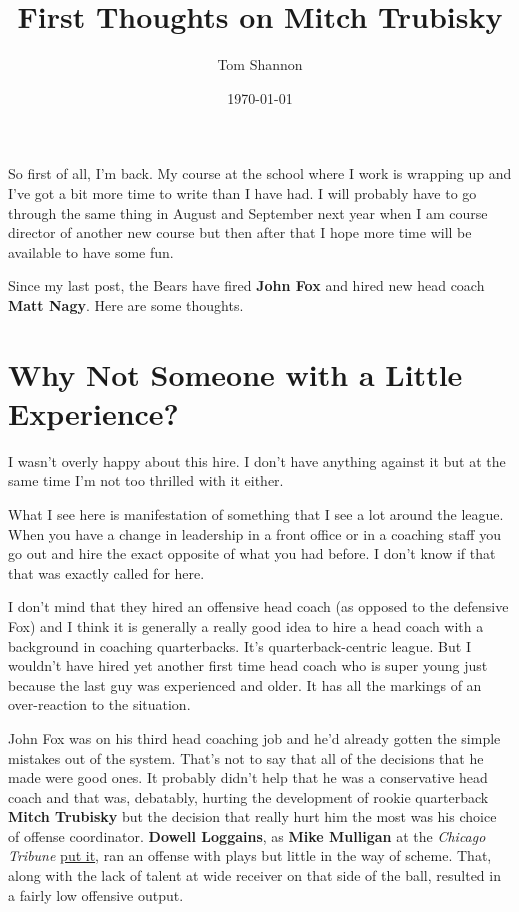 \documentclass[11pt]{article}
\author{Tom Shannon}
\date{\today}
\title{First Thoughts on Mitch Trubisky}
\begin{document}
\maketitle
\tableofcontents

So first of all, I'm back.  My course at the school where I work is
wrapping up and I've got a bit more time to write than I have had.  I
will probably have to go through the same thing in August and
September next year when I am course director of another new course
but then after that I hope more time will be available to have some
fun.

Since my last post, the Bears have fired \textbf{John Fox} and hired
new head coach \textbf{Matt Nagy}.  Here are some thoughts.

\section{Why Not Someone with a Little Experience?}

I wasn't overly happy about this hire.  I don't have anything against
it but at the same time I'm not too thrilled with it either.

What I see here is manifestation of something that I see a lot
around the league.  When you have a change in leadership in a front
office or in a coaching staff you go out and hire the exact opposite
of what you had before.  I don't know if that that was exactly called
for here.

I don't mind that they hired an offensive head coach (as opposed to
the defensive Fox) and I think it is generally a really good idea to
hire a head coach with a background in coaching quarterbacks.  It's
quarterback-centric league.  But I wouldn't have hired yet another
first time head coach who is super young just because the last guy was
experienced and older.  It has all the markings of an over-reaction to the situation.

John Fox was on his third head coaching job and he'd already gotten
the simple mistakes out of the system.  That's not to say that all of
the decisions that he made were good ones.  It probably didn't help
that he was a conservative head coach and that was, debatably, hurting
the development of rookie quarterback \textbf{Mitch Trubisky} but the
decision that really hurt him the most was his choice of offense
coordinator. \textbf{Dowell Loggains}, as \textbf{Mike Mulligan} at
the \textit{Chicago Tribune}
\href{http://www.chicagotribune.com/sports/football/bears/ct-spt-bears-offseason-changes-mulligan-20171226-story.html}{put
  it}, ran an offense with plays but little in the way of scheme.
That, along with the lack of talent at wide receiver on that side of
the ball, resulted in a fairly low offensive output.
\end{document}
